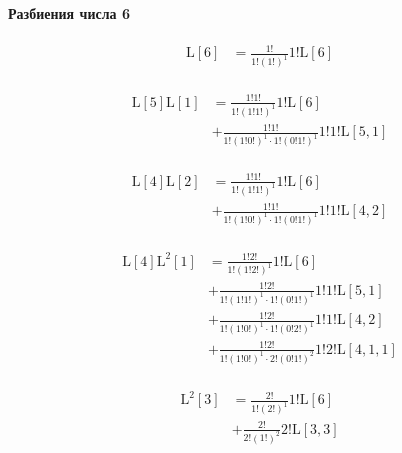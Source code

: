 \paragraph{Разбиения числа 6}

\begin{equation*} \begin{aligned}
  \mathrm{L}[6] &=
  \frac{1!}{1!(1!)^1}
  1! \mathrm{L}[6] \\
\end{aligned} \end{equation*}

\begin{equation*} \begin{aligned}
  \mathrm{L}[5] \mathrm{L}[1] &=
  \frac{1!1!}{1!(1!1!)^1}
  1! \mathrm{L}[6] \\ &
+ \frac{1!1!}{1!(1!0!)^1 \cdot 1!(0!1!)^1}
  1!1! \mathrm{L}[5, 1] \\
\end{aligned} \end{equation*}

\begin{equation*} \begin{aligned}
  \mathrm{L}[4] \mathrm{L}[2] &=
  \frac{1!1!}{1!(1!1!)^1}
  1! \mathrm{L}[6] \\ &
+ \frac{1!1!}{1!(1!0!)^1 \cdot 1!(0!1!)^1}
  1!1! \mathrm{L}[4, 2] \\
\end{aligned} \end{equation*}

\begin{equation*} \begin{aligned}
  \mathrm{L}[4] \mathrm{L}^2[1] &=
  \frac{1!2!}{1!(1!2!)^1}
  1! \mathrm{L}[6] \\ &
+ \frac{1!2!}{1!(1!1!)^1 \cdot 1!(0!1!)^1}
  1!1! \mathrm{L}[5, 1] \\ &
+ \frac{1!2!}{1!(1!0!)^1 \cdot 1!(0!2!)^1}
  1!1! \mathrm{L}[4, 2] \\ &
+ \frac{1!2!}{1!(1!0!)^1 \cdot 2!(0!1!)^2}
  1!2! \mathrm{L}[4, 1, 1] \\
\end{aligned} \end{equation*}

\begin{equation*} \begin{aligned}
  \mathrm{L}^2[3] &=
  \frac{2!}{1!(2!)^1}
  1! \mathrm{L}[6] \\ &
+ \frac{2!}{2!(1!)^2}
  2! \mathrm{L}[3, 3] \\
\end{aligned} \end{equation*}

